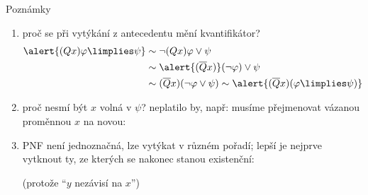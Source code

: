 \documentclass{beamer}
\begin{document}
\begin{frame}{Poznámky}

    \begin{enumerate}
        \pause
        \item proč se při vytýkání z \alert{antecedentu} mění kvantifikátor?
        \begin{align*}
            \alert{(Qx)\varphi \limplies \psi}&\sim\neg(Qx)\varphi \lor\psi\\&\sim\alert{(\overline{Q}x)}(\neg\varphi)\lor\psi\\
            &\sim(\overline{Q}x)(\neg\varphi\lor\psi)\sim \alert{(\overline{Q}x)(\varphi \limplies \psi)}    
        \end{align*}

        \medskip

        \pause
        \item proč nesmí být $x$ volná v $\psi$? neplatilo by, např:
        \pause
        musíme přejmenovat vázanou proměnnou $x$ na novou: 
        

        \medskip

        \pause
        \item PNF není jednoznačná, lze vytýkat v různém pořadí; lepší je nejprve vytknout ty, \alert{ze kterých se nakonec stanou existenční:}
        
        \medskip

        
        \medskip

        (protože ``$y$ nezávisí na $x$'')
    \end{enumerate}

\end{frame}
\end{document}
